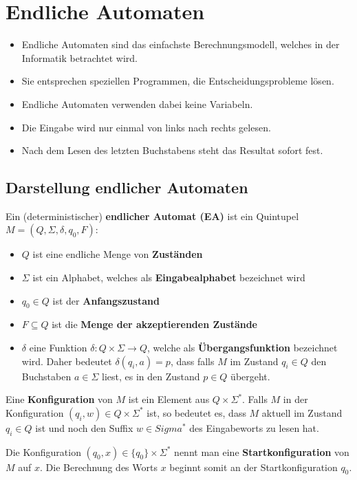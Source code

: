 \chapter{Endliche Automaten}
\begin{itemize}
  \item Endliche Automaten sind das einfachste Berechnungsmodell, welches in der Informatik betrachtet wird.
  \item Sie entsprechen speziellen Programmen, die Entscheidungsprobleme lösen.
  \item Endliche Automaten verwenden dabei keine Variabeln.
  \item Die Eingabe wird nur einmal von links nach rechts gelesen.
  \item Nach dem Lesen des letzten Buchstabens steht das Resultat sofort fest.
\end{itemize}

\section{Darstellung endlicher Automaten}
\begin{definition}
Ein (deterministischer) \textbf{endlicher Automat (EA)} ist ein Quintupel $M = (Q, \Sigma, \delta, q_0, F)$:
\begin{itemize}
  \item $Q$ ist eine endliche Menge von \textbf{Zuständen}
  \item $\Sigma$ ist ein Alphabet, welches als \textbf{Eingabealphabet} bezeichnet wird
  \item $q_0 \in Q$ ist der \textbf{Anfangszustand}
  \item $F \subseteq Q$ ist die \textbf{Menge der akzeptierenden Zustände}
  \item $\delta$ eine Funktion $\delta: Q \times \Sigma \to Q$, welche als \textbf{Übergangsfunktion} bezeichnet wird. Daher bedeutet $\delta(q_i, a) = p$, dass falls $M$ im Zustand $q_i \in Q$ den Buchstaben $a \in \Sigma$ liest, es in den Zustand $p \in Q$ übergeht.\\
\end{itemize}

\end{definition}

\begin{definition}
Eine \textbf{Konfiguration} von $M$ ist ein Element aus $Q \times \Sigma^*$. Falls $M$ in der Konfiguration $(q_i, w) \in Q \times \Sigma^*$ ist, so bedeutet es, dass $M$ aktuell im Zustand $q_i \in Q$ ist und noch den Suffix $w \in Sigma^*$ des Eingabeworts zu lesen hat.

Die Konfiguration $(q_0, x) \in \{q_0\} \times \Sigma^*$ nennt man eine \textbf{Startkonfiguration} von $M$ auf $x$. Die Berechnung des Worts $x$ beginnt somit an der Startkonfiguration $q_0$.\\
\end{definition}

